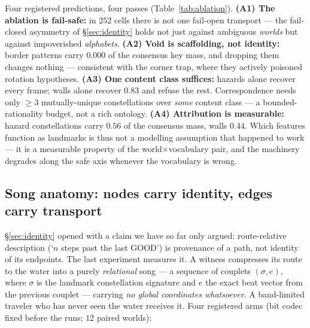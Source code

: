 \documentclass{article}
\begin{document}
Four registered predictions, four passes (Table~\ref{tab:ablation}).
\textbf{(A1) The ablation is fail-safe:} in $252$ cells there is not
one fail-open transport --- the fail-closed asymmetry of
\S\ref{sec:identity} holds not just against ambiguous \emph{worlds}
but against impoverished \emph{alphabets}. \textbf{(A2) Void is
scaffolding, not identity:} border patterns carry $0.000$ of the
consensus key mass, and dropping them changes nothing --- consistent
with the corner trap, where they actively poisoned rotation
hypotheses. \textbf{(A3) One content class suffices:} hazards alone
recover every frame; walls alone recover $0.83$ and refuse the rest.
Correspondence needs only $\ge 3$ mutually-unique constellations over
\emph{some} content class --- a bounded-rationality budget, not a rich
ontology. \textbf{(A4) Attribution is measurable:} hazard
constellations carry $0.56$ of the consensus mass, walls $0.44$.
Which features function as landmarks is thus not a modelling
assumption that happened to work --- it is a measurable property of
the world$\times$vocabulary pair, and the machinery degrades along
the safe axis whenever the vocabulary is wrong.

\subsection{Song anatomy: nodes carry identity, edges carry transport}
\label{sec:anatomy}

\S\ref{sec:identity} opened with a claim we have so far only argued:
route-relative description (`$n$ steps past the last GOOD') is
provenance of a path, not identity of its endpoints. The last
experiment measures it. A witness compresses its route to the water
into a purely \emph{relational} song --- a sequence of couplets
$(\sigma, e)$, where $\sigma$ is the landmark constellation signature
and $e$ the exact beat vector from the previous couplet --- carrying
\emph{no global coordinates whatsoever}. A band-limited traveler who
has never seen the water receives it. Four registered arms (bit codec
fixed before the runs; $12$ paired worlds):
\end{document}
